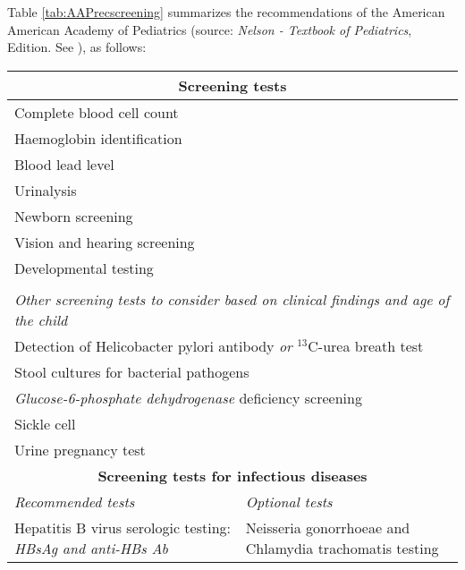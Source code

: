 Table \ref{tab:AAPrecscreening} summarizes the recommendations of the American American Academy of Pediatrics (source: \textit{Nelson - Textbook of Pediatrics},  Edition. See \cite{nelson}), as follows:

\newlength\mylength
\setlength\mylength{\dimexpr\textwidth-5\arrayrulewidth-8\tabcolsep}

\vspace{0.5cm}
\begin{footnotesize}
    \centering
	\begin{longtable}{p{0.5\mylength} p{0.5\mylength}}
	   	 \hline
	      \multicolumn{2}{c}{\small{\textbf{Screening tests}}}\\
	      \hline
	      \multicolumn{2}{l}{Complete blood cell count}\\
	      \multicolumn{2}{l}{Haemoglobin identification}\\
	      \multicolumn{2}{l}{Blood lead level}\\
	      \multicolumn{2}{l}{Urinalysis}\\
	      \multicolumn{2}{l}{Newborn screening\footnotemark[2]}\\
	      \multicolumn{2}{l}{Vision and hearing screening}\\
	      \multicolumn{2}{l}{Developmental testing}\\\\
	      \multicolumn{2}{l}{\textit{Other screening tests to consider based on clinical findings and age of the child}}\\
	      \multicolumn{2}{l}{Detection of Helicobacter pylori antibody \textit{or} $^{13}$C-urea breath test}\\
	      \multicolumn{2}{l}{Stool cultures for bacterial pathogens}\\
	      \multicolumn{2}{l}{\textit{Glucose-6-phosphate dehydrogenase} deficiency screening}\\
	      \multicolumn{2}{l}{Sickle cell}\\
	      \multicolumn{2}{l}{Urine pregnancy test}\\
	      \hline
	      \multicolumn{2}{c}{\small{\textbf{Screening tests for infectious diseases}}}\\
	      \hline
	      \textit{Recommended tests} & \textit{Optional tests}\\
	      Hepatitis B virus serologic testing: \textit{HBsAg and anti-HBs Ab}\footnotemark[3] & Neisseria gonorrhoeae and Chlamydia trachomatis testing\\

\end{longtable}
\end{footnotesize}
